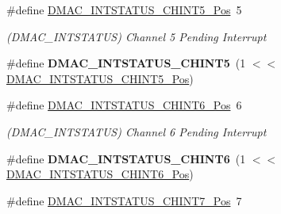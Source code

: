 \begin{DoxyCompactItemize}
\item 
\hypertarget{group___s_a_m_l21___d_m_a_c_ga5f858121c4a8fe901bdd768dcdc3e09d}{}\#define \hyperlink{group___s_a_m_l21___d_m_a_c_ga5f858121c4a8fe901bdd768dcdc3e09d}{D\+M\+A\+C\+\_\+\+I\+N\+T\+S\+T\+A\+T\+U\+S\+\_\+\+C\+H\+I\+N\+T5\+\_\+\+Pos}~5\label{group___s_a_m_l21___d_m_a_c_ga5f858121c4a8fe901bdd768dcdc3e09d}

\begin{DoxyCompactList}\small\item\em (D\+M\+A\+C\+\_\+\+I\+N\+T\+S\+T\+A\+T\+U\+S) Channel 5 Pending Interrupt \end{DoxyCompactList}\item 
\hypertarget{group___s_a_m_l21___d_m_a_c_gaa3d80e7cb825e2c4f815e3ed7df929a1}{}\#define {\bfseries D\+M\+A\+C\+\_\+\+I\+N\+T\+S\+T\+A\+T\+U\+S\+\_\+\+C\+H\+I\+N\+T5}~(1 $<$$<$ \hyperlink{group___s_a_m_l21___d_m_a_c_ga5f858121c4a8fe901bdd768dcdc3e09d}{D\+M\+A\+C\+\_\+\+I\+N\+T\+S\+T\+A\+T\+U\+S\+\_\+\+C\+H\+I\+N\+T5\+\_\+\+Pos})\label{group___s_a_m_l21___d_m_a_c_gaa3d80e7cb825e2c4f815e3ed7df929a1}

\item 
\hypertarget{group___s_a_m_l21___d_m_a_c_ga57134650948080127ba00dc467522770}{}\#define \hyperlink{group___s_a_m_l21___d_m_a_c_ga57134650948080127ba00dc467522770}{D\+M\+A\+C\+\_\+\+I\+N\+T\+S\+T\+A\+T\+U\+S\+\_\+\+C\+H\+I\+N\+T6\+\_\+\+Pos}~6\label{group___s_a_m_l21___d_m_a_c_ga57134650948080127ba00dc467522770}

\begin{DoxyCompactList}\small\item\em (D\+M\+A\+C\+\_\+\+I\+N\+T\+S\+T\+A\+T\+U\+S) Channel 6 Pending Interrupt \end{DoxyCompactList}\item 
\hypertarget{group___s_a_m_l21___d_m_a_c_ga9ca4014e666ad719e8e63d418d4ca88d}{}\#define {\bfseries D\+M\+A\+C\+\_\+\+I\+N\+T\+S\+T\+A\+T\+U\+S\+\_\+\+C\+H\+I\+N\+T6}~(1 $<$$<$ \hyperlink{group___s_a_m_l21___d_m_a_c_ga57134650948080127ba00dc467522770}{D\+M\+A\+C\+\_\+\+I\+N\+T\+S\+T\+A\+T\+U\+S\+\_\+\+C\+H\+I\+N\+T6\+\_\+\+Pos})\label{group___s_a_m_l21___d_m_a_c_ga9ca4014e666ad719e8e63d418d4ca88d}

\item 
\hypertarget{group___s_a_m_l21___d_m_a_c_ga434933267e89e51d56307c9a32334894}{}\#define \hyperlink{group___s_a_m_l21___d_m_a_c_ga434933267e89e51d56307c9a32334894}{D\+M\+A\+C\+\_\+\+I\+N\+T\+S\+T\+A\+T\+U\+S\+\_\+\+C\+H\+I\+N\+T7\+\_\+\+Pos}~7\label{group___s_a_m_l21___d_m_a_c_ga434933267e89e51d56307c9a32334894}


\end{DoxyCompactItemize}
